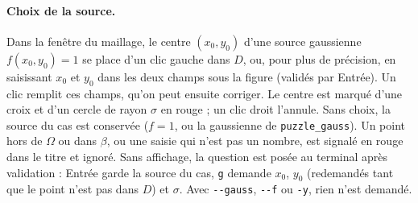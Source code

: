 \documentclass[11pt,a4paper]{article}
\begin{document}
\paragraph{Choix de la source.} Dans la fenêtre du maillage, le centre
$(x_0, y_0)$ d'une source gaussienne $f(x_0, y_0) = 1$ se place d'un clic
gauche dans $D$, ou, pour plus de précision, en saisissant $x_0$ et $y_0$
dans les deux champs sous la figure (validés par Entrée). Un clic remplit
ces champs, qu'on peut ensuite corriger. Le centre est marqué d'une croix et
d'un cercle de rayon $\sigma$ en rouge ; un clic droit l'annule. Sans choix,
la source du cas est conservée ($f = 1$, ou la gaussienne de
\texttt{puzzle\_gauss}). Un point hors de $\Omega$ ou dans $\beta$, ou une
saisie qui n'est pas un nombre, est signalé en rouge dans le titre et
ignoré. Sans affichage,
la question est posée au terminal après validation : Entrée garde la source
du cas, \texttt{g} demande $x_0$, $y_0$ (redemandés tant que le point n'est
pas dans $D$) et $\sigma$. Avec \texttt{-{}-gauss}, \texttt{-{}-f} ou \texttt{-y},
rien n'est demandé.
\end{document}
